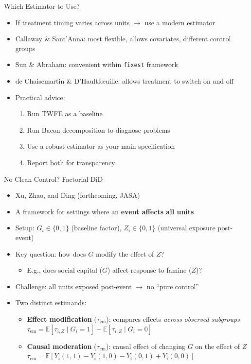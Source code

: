 \documentclass[10pt, handout]{beamer}
\begin{document}
\begin{frame}{Which Estimator to Use?}
  \begin{itemize}
    \item If treatment timing varies across units $\to$ use a modern estimator
    \item Callaway \& Sant'Anna: most flexible, allows covariates, different control groups
    \item Sun \& Abraham: convenient within \texttt{fixest} framework
    \item de Chaisemartin \& D'Haultf\oe uille: allows treatment to switch on and off
    \item Practical advice:
      \begin{enumerate}
        \item Run TWFE as a baseline
        \item Run Bacon decomposition to diagnose problems
        \item Use a robust estimator as your main specification
        \item Report both for transparency
      \end{enumerate}
  \end{itemize}
\end{frame}


\begin{frame}{No Clean Control? Factorial DiD}
  \begin{itemize}
    \item Xu, Zhao, and Ding (forthcoming, JASA)
    \item A framework for settings where an \textbf{event affects all units}
    \item Setup: $G_i \in \{0,1\}$ (baseline factor), $Z_i \in \{0,1\}$ (universal exposure post-event)
    \item Key question: how does $G$ modify the effect of $Z$?
      \begin{itemize}
        \item E.g., does social capital ($G$) affect response to famine ($Z$)?
      \end{itemize}
    \item Challenge: all units exposed post-event $\to$ no ``pure control''
    \item Two distinct estimands:
      \begin{itemize}
        \item \textbf{Effect modification} ($\tau_{\text{em}}$): compares effects \textit{across observed subgroups}
          $\tau_{\text{em}} = \mathbb{E}[\tau_{i,Z} \mid G_i = 1] - \mathbb{E}[\tau_{i,Z} \mid G_i = 0]$
        \item \textbf{Causal moderation} ($\tau_{\text{cm}}$): causal effect of changing $G$ on the effect of $Z$
          $\tau_{\text{cm}} = \mathbb{E}[Y_i(1,1) - Y_i(1,0) - Y_i(0,1) + Y_i(0,0)]$
      \end{itemize}
  \end{itemize}
\end{frame}
\end{document}
